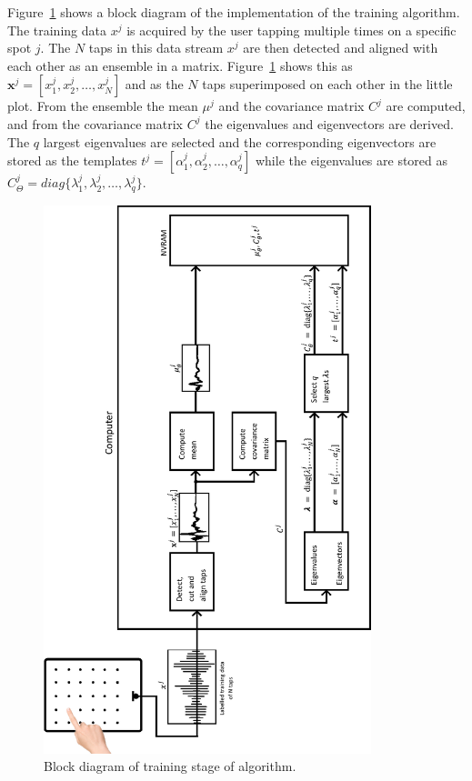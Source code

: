 Figure~\ref{fig:trainingsytemRotate} shows a block diagram of the implementation of the training algorithm. The training data $x^j$ is acquired by the user tapping multiple times on a specific spot $j$. The $N$ taps in this data stream $x^j$ are then detected and aligned with each other as an ensemble in a matrix. Figure~\ref{fig:trainingsytemRotate} shows this as $\textbf{x}^j =  [ x_1^j, x_2^j, \ldots , x_N^j ] $ and as the $N$ taps superimposed on each other in the little plot. From the ensemble the mean $\mu^j$ and the covariance matrix $C^j$ are computed, and from the covariance matrix $C^j$ the eigenvalues and eigenvectors are derived. The $q$ largest eigenvalues are selected and the corresponding eigenvectors are stored as the templates $t^j = [\alpha^j_1,\alpha^j_2,\ldots,\alpha^j_q] $ while the eigenvalues are stored as $C_\Theta^j = diag\{\lambda_1^j,\lambda_2^j,\ldots,\lambda_q^j \}$.

\begin{figure}[!]
\centering
\includegraphics[width=360px]{trainingsytemRotate.pdf}
\caption{Block diagram of training stage of algorithm.}\label{fig:trainingsytemRotate}
\end{figure}

